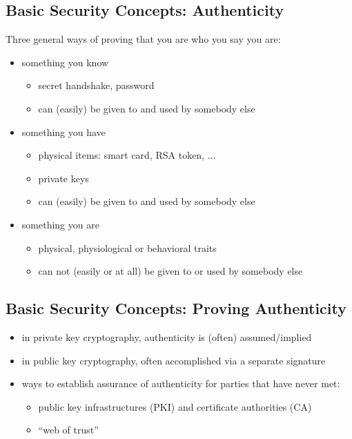 \documentclass[xga]{xdvislides}
\begin{document}
\subsection{Basic Security Concepts: Authenticity}
Three general ways of proving that you are who you say you are:
\begin{itemize}
	\item something you know
		\begin{itemize}
			\item secret handshake, password
			\item can (easily) be given to and used by somebody else
		\end{itemize}
	\item something you have
		\begin{itemize}
			\item physical items: smart card, RSA token, ...
			\item private keys
			\item can (easily) be given to and used by somebody else
		\end{itemize}
	\item something you are
		\begin{itemize}
			\item physical, physiological or behavioral traits
			\item can not (easily or at all) be given to or
				used by somebody else
		\end{itemize}
\end{itemize}



\subsection{Basic Security Concepts: Proving Authenticity}
\begin{itemize}
	\item in private key cryptography, authenticity is (often) assumed/implied
	\item in public key cryptography, often accomplished via a separate
		signature
	\item ways to establish assurance of authenticity for parties that have
		never met:
		\begin{itemize}
			\item public key infrastructures (PKI) and certificate
				authorities (CA)
			\item ``web of trust''
		\end{itemize}
\end{itemize}
\end{document}
